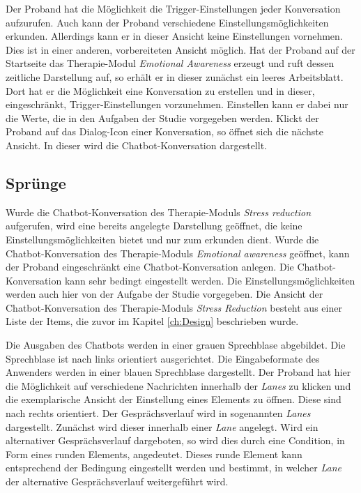 Der Proband hat die Möglichkeit die Trigger-Einstellungen jeder Konversation aufzurufen. Auch kann der Proband verschiedene Einstellungsmöglichkeiten erkunden. Allerdings kann er in dieser Ansicht keine Einstellungen vornehmen. Dies ist in einer anderen, vorbereiteten Ansicht möglich. Hat der Proband auf der Startseite das Therapie-Modul \emph{Emotional Awareness} erzeugt und ruft dessen zeitliche Darstellung auf, so erhält er in dieser zunächst ein leeres Arbeitsblatt. Dort hat er die Möglichkeit eine Konversation zu erstellen und in dieser, eingeschränkt, Trigger-Einstellungen vorzunehmen. Einstellen kann er dabei nur die Werte, die in den Aufgaben der Studie vorgegeben werden. Klickt der Proband auf das Dialog-Icon einer Konversation, so öffnet sich die nächste Ansicht. In dieser wird die Chatbot-Konversation dargestellt. 

\subsection{Sprünge}
Wurde die Chatbot-Konversation des Therapie-Moduls \emph{Stress reduction} aufgerufen, wird eine bereits angelegte Darstellung geöffnet, die keine Einstellungsmöglichkeiten bietet und nur zum erkunden dient. Wurde die Chatbot-Konversation des Therapie-Moduls \emph{Emotional awareness} geöffnet, kann der Proband eingeschränkt eine Chatbot-Konversation anlegen. Die Chatbot-Konversation kann sehr bedingt eingestellt werden. Die Einstellungsmöglichkeiten werden auch hier von der Aufgabe der Studie vorgegeben. Die Ansicht der Chatbot-Konversation des Therapie-Moduls \emph{Stress Reduction} besteht aus einer Liste der Items, die zuvor im Kapitel \ref{ch:Design} beschrieben wurde. 

Die Ausgaben des Chatbots werden in einer grauen Sprechblase abgebildet. Die Sprechblase ist nach links orientiert ausgerichtet. Die Eingabeformate des Anwenders werden in einer blauen Sprechblase dargestellt. Der Proband hat hier die Möglichkeit auf verschiedene Nachrichten innerhalb der \emph{Lanes} zu klicken und die exemplarische Ansicht der Einstellung eines Elements zu öffnen. Diese sind nach rechts orientiert. Der Gesprächsverlauf wird in sogenannten \emph{Lanes} dargestellt. Zunächst wird dieser innerhalb einer \emph{Lane} angelegt. Wird ein alternativer Gesprächsverlauf dargeboten, so wird dies durch eine Condition, in Form eines runden Elements, angedeutet. Dieses runde Element kann entsprechend der Bedingung eingestellt werden und bestimmt, in welcher \emph{Lane} der alternative Gesprächsverlauf weitergeführt wird. 


